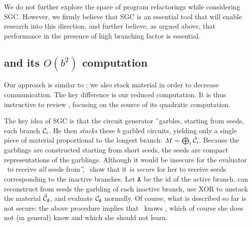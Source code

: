We do not further explore the space of program refactorings while
considering SGC.
However, we firmly believe that SGC is an essential tool that will
enable research into this direction, and further believe, as argued
above, that performance in the presence of high branching factor is
essential.




\subsection{\HK and its $O(b^2)$ computation}
\label{sec:bsquaredcost}

Our approach is similar to \HK: we also stack material in
order to decrease communication.
The key difference is our reduced computation.
It is thus instructive to review \HK,
focusing on the source of its quadratic computation.

The key idea of SGC is that the circuit generator \G\ garbles,
starting from seeds, each branch $\mathcal C_i$.
He then \emph{stacks} these $b$ garbled circuits, yielding only a
single piece of material proportional to the longest branch: $M =
\bigoplus_i \hat{\mathcal C}_i$.
Because the garblings are constructed starting from short seeds, the
seeds are compact representations of the garblings.
%
Although it would be insecure for the evaluator \E\ to receive
\emph{all} seeds from \G, \HK\ show that it \emph{is secure} for her
to receive seeds corresponding to the inactive branches.
Let $\mathtt{A}$ be the id of the active branch.
\E can reconstruct from seeds the garbling of each inactive branch, use XOR to unstack
the material $\hat{\mathcal C}_{\mathtt{A}}$, and evaluate $\mathcal C_{\mathtt{A}}$ normally.
%
Of course, what is described so far is not secure: the above procedure
implies that \E\ knows \aid, which of course she does not (in general)
know and which she should not learn.


